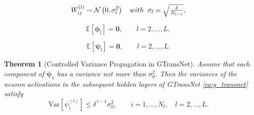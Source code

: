 \documentclass[10pt,a4paper]{amsart}
\newtheorem{theorem}{Theorem}
\newcommand{\vphi}{\boldsymbol{\phi}}
\newcommand{\vpsi}{\boldsymbol{\psi}}
\begin{document}
\begin{equation}\label{eq:sample_W}
W_{ij}^{(l)} \sim \mathcal{N} \left(0,\sigma_l^2\right)
\quad{\rm with}\;\;
\sigma_l = \textstyle\sqrt{\frac{\delta}{N_{l-1}}},
\end{equation}

\begin{equation}\label{eq:E_phi}
\mathbb{E}[\vphi_l] = \mathbf{0}, \qquad l=2,\dots,L,
\end{equation}

\begin{equation}\label{eq:E_psi}
\mathbb{E}[\vpsi_l] = \mathbf{0}, \qquad l=2,\dots,L.
\end{equation}

\begin{theorem}[Controlled Variance Propagation in GTransNet]\label{thm:1}
Assume that each component of $\vpsi_1$ has a variance not more than $\sigma_0^2$. 
Then the variances of the neuron activations  in  the subsequent hidden layers of GTransNet \eqref{eq:g_transnet}  satisfy
\begin{equation}\label{eq:var_psi}
\mathrm{Var}[\psi_i^{(l)}] \le \delta^{\,l-1}\sigma_0^2,
\qquad i=1,\dots,N_l,\quad l=2,\dots,L.
\end{equation} 
\end{theorem}
\end{document}
